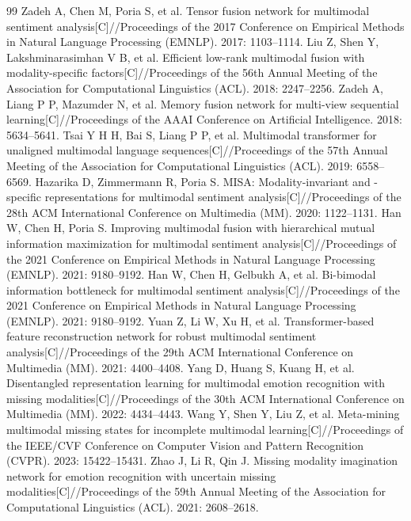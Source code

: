 \documentclass[UTF8,a4paper,11pt]{ctexart}
\begin{document}
\begin{thebibliography}{99}
 Zadeh A, Chen M, Poria S, et al. Tensor fusion network for multimodal sentiment analysis[C]//Proceedings of the 2017 Conference on Empirical Methods in Natural Language Processing (EMNLP). 2017: 1103--1114.
 Liu Z, Shen Y, Lakshminarasimhan V B, et al. Efficient low-rank multimodal fusion with modality-specific factors[C]//Proceedings of the 56th Annual Meeting of the Association for Computational Linguistics (ACL). 2018: 2247--2256.
 Zadeh A, Liang P P, Mazumder N, et al. Memory fusion network for multi-view sequential learning[C]//Proceedings of the AAAI Conference on Artificial Intelligence. 2018: 5634--5641.
 Tsai Y H H, Bai S, Liang P P, et al. Multimodal transformer for unaligned multimodal language sequences[C]//Proceedings of the 57th Annual Meeting of the Association for Computational Linguistics (ACL). 2019: 6558--6569.
 Hazarika D, Zimmermann R, Poria S. MISA: Modality-invariant and -specific representations for multimodal sentiment analysis[C]//Proceedings of the 28th ACM International Conference on Multimedia (MM). 2020: 1122--1131.
 Han W, Chen H, Poria S. Improving multimodal fusion with hierarchical mutual information maximization for multimodal sentiment analysis[C]//Proceedings of the 2021 Conference on Empirical Methods in Natural Language Processing (EMNLP). 2021: 9180--9192.
 Han W, Chen H, Gelbukh A, et al. Bi-bimodal information bottleneck for multimodal sentiment analysis[C]//Proceedings of the 2021 Conference on Empirical Methods in Natural Language Processing (EMNLP). 2021: 9180--9192.
 Yuan Z, Li W, Xu H, et al. Transformer-based feature reconstruction network for robust multimodal sentiment analysis[C]//Proceedings of the 29th ACM International Conference on Multimedia (MM). 2021: 4400--4408.
 Yang D, Huang S, Kuang H, et al. Disentangled representation learning for multimodal emotion recognition with missing modalities[C]//Proceedings of the 30th ACM International Conference on Multimedia (MM). 2022: 4434--4443.
 Wang Y, Shen Y, Liu Z, et al. Meta-mining multimodal missing states for incomplete multimodal learning[C]//Proceedings of the IEEE/CVF Conference on Computer Vision and Pattern Recognition (CVPR). 2023: 15422--15431.
 Zhao J, Li R, Qin J. Missing modality imagination network for emotion recognition with uncertain missing modalities[C]//Proceedings of the 59th Annual Meeting of the Association for Computational Linguistics (ACL). 2021: 2608--2618.
\end{thebibliography}
\end{document}
